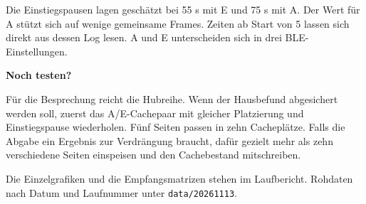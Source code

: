 \documentclass[a4paper,11pt]{article}
\begin{document}
Die Einstiegspausen lagen geschätzt bei 55 s mit E und 75 s mit A. Der Wert für A stützt sich auf wenige gemeinsame Frames. Zeiten ab Start von 5 lassen sich direkt aus dessen Log lesen. A und E unterscheiden sich in drei BLE-Einstellungen.

\textbf{Noch testen?}

Für die Besprechung reicht die Hubreihe. Wenn der Hausbefund abgesichert werden soll, zuerst das A/E-Cachepaar mit gleicher Platzierung und Einstiegspause wiederholen. Fünf Seiten passen in zehn Cacheplätze. Falls die Abgabe ein Ergebnis zur Verdrängung braucht, dafür gezielt mehr als zehn verschiedene Seiten einspeisen und den Cachebestand mitschreiben.

{\small Die Einzelgrafiken und die Empfangsmatrizen stehen im Laufbericht. Rohdaten nach Datum und Laufnummer unter \texttt{data/20261113}.}
\end{document}
